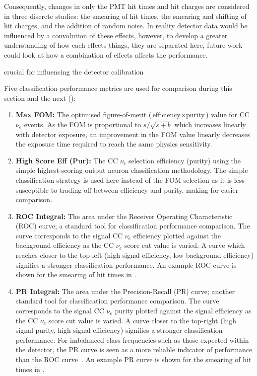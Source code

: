 Consequently, changes in only the PMT hit times and hit charges are considered in three discrete
studies: the smearing of hit times, the smearing and shifting of hit charges, and the addition of
random noise. In reality detector data would be influenced by a convolution of these effects,
however, to develop a greater understanding of how each effects things, they are separated here,
future work could look at how a combination of effects affects the performance.

crucial for influencing the detector calibration 

Five classification performance metrics are used for comparison during this section and the next
():
\begin{enumerate}
    \item \textbf{Max FOM:} The optimised figure-of-merit ($\text{efficiency}\times\text{purity}$)
          value for CC $\nu_{e}$ events. As the FOM is proportional to $s/\sqrt{s+b}$ which
          increases linearly with detector exposure, an improvement in the FOM value linearly
          decreases the exposure time required to reach the same physics sensitivity.
    \item \textbf{High Score Eff (Pur):} The CC $\nu_{e}$ selection efficiency (purity) using the
          simple highest-scoring output neuron classification methodology. The simple
          classification strategy is used here instead of the FOM selection as it is less
          susceptible to trading off between efficiency and purity, making for easier comparison.
    \item \textbf{ROC Integral:} The area under the Receiver Operating Characteristic (ROC) curve;
          a standard tool for classification performance comparison. The curve corresponds to the
          signal CC $\nu_{e}$ efficiency plotted against the background efficiency as the CC
          $\nu_{e}$ score cut value is varied. A curve which reaches closer to the top-left (high
          signal efficiency, low background efficiency) signifies a stronger classification
          performance. An example ROC curve is shown for the smearing of hit times in
          .
    \item \textbf{PR Integral:} The area under the Precision-Recall (PR) curve; another standard
          tool for classification performance comparison. The curve corresponds to the signal CC
          $\nu_{e}$ purity plotted against the signal efficiency as the CC $\nu_{e}$ score cut
          value is varied. A curve closer to the top-right (high signal purity, high signal
          efficiency) signifies a stronger classification performance. For imbalanced class
          frequencies such as those expected within the \chipsfive detector, the PR curve is seen
          as a more reliable indicator of performance than the ROC curve~\cite{saito2015}. An
          example PR curve is shown for the smearing of hit times in
          .
\end{enumerate}

